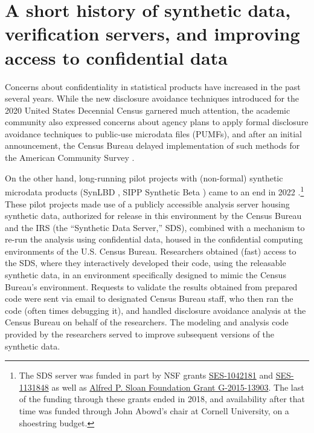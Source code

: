 \documentclass[]{hdsr}
\begin{document}
\section{A short history of synthetic data, verification servers, and improving access to confidential data}
\label{sec1}
\label{intro}

Concerns about confidentiality in statistical products have increased in the past several years. While the new disclosure avoidance techniques introduced for the 2020 United States Decennial Census \citep{abowd_2020_2022} garnered much attention, the academic community also expressed concerns about agency plans to apply formal disclosure avoidance techniques to public-use microdata files (PUMFs), and after an initial announcement, the Census Bureau delayed implementation of such methods for the American Community Survey \citep{daily_disclosure_2022}.

On the other hand, long-running pilot projects with (non-formal) synthetic microdata products (SynLBD \citep{KinneyEtAl2011}, SIPP Synthetic Beta \citep{Benedettoetal_2013}) came to an end in 2022 \citep{vilhuber_end_2022}.\footnote{The SDS server was funded in part by NSF grants \href{http://www.nsf.gov/awardsearch/showAward.do?AwardNumber=1042181}{SES-1042181} and \href{http://www.nsf.gov/awardsearch/showAward.do?AwardNumber=1131848}{SES-1131848} as well as \href{https://sloan.org/grant-detail/6845}{Alfred P. Sloan Foundation Grant G-2015-13903}. The last of the funding through these grants ended in 2018, and availability after that time was funded through John Abowd's chair at Cornell University, on a shoestring budget.} These pilot projects made use of a publicly accessible analysis server housing synthetic data, authorized for release in this environment by the Census Bureau and the IRS (the ``Synthetic Data Server,'' SDS), combined with a mechanism to re-run the analysis using confidential data, housed in the confidential computing environments of the U.S. Census Bureau. Researchers obtained (fast) access to the SDS, where they interactively developed their code, using the releasable synthetic data, in an environment specifically designed to mimic the Census Bureau's environment. Requests to validate the results obtained from prepared code were sent via email to designated Census Bureau staff, who then ran the code (often times debugging it), and handled disclosure avoidance analysis at the Census Bureau on behalf of the researchers. The modeling and analysis code provided by the researchers served to improve subsequent versions of the synthetic data. 
\end{document}
